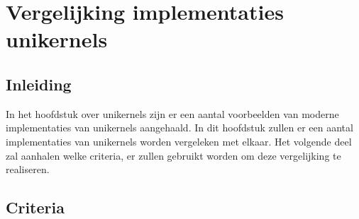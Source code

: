 \chapter{Vergelijking implementaties unikernels}
\label{ch:vergelijking-unikernels}

\section{Inleiding}

In het hoofdstuk over unikernels zijn er een aantal voorbeelden van moderne implementaties van unikernels aangehaald. In dit hoofdstuk zullen er een aantal implementaties van unikernels worden vergeleken met elkaar. Het volgende deel zal aanhalen welke criteria, er zullen gebruikt worden om deze vergelijking te realiseren.

\section{Criteria}

